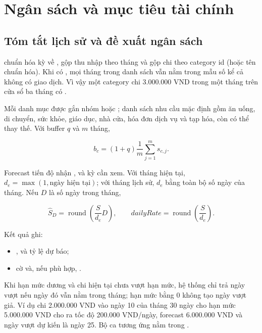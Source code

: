 \section{Ngân sách và mục tiêu tài chính}
\label{app:planning-algorithms}

\subsection{Tóm tắt lịch sử và đề xuất ngân sách}

 chuẩn hóa kỳ về , gộp thu nhập theo tháng và gộp chi theo category id (hoặc tên chuẩn hóa). Khi có , mọi tháng trong danh sách vẫn nằm trong mẫu số kể cả không có giao dịch. Vì vậy một category chi 3.000.000 VND trong một tháng trên cửa sổ ba tháng có .

Mỗi danh mục được gắn nhóm  hoặc ; danh sách nhu cầu mặc định gồm ăn uống, di chuyển, sức khỏe, giáo dục, nhà cửa, hóa đơn dịch vụ và tạp hóa, còn  có thể thay thế. Với buffer $q$ và $m$ tháng,

\begin{equation}
  b_c=(1+q)\frac{1}{m}\sum_{j=1}^{m}s_{c,j}.
\end{equation}

Forecast tiến độ nhận ,  và kỳ cần xem. Với tháng hiện tại, $d_e=\max(1,\text{ngày hiện tại})$; với tháng lịch sử, $d_e$ bằng toàn bộ số ngày của tháng. Nếu $D$ là số ngày trong tháng,

\begin{equation}
  \widehat S_D=\operatorname{round}\!\left(\frac{S}{d_e}D\right),
  \qquad dailyRate=\operatorname{round}\!\left(\frac{S}{d_e}\right).
\end{equation}

Kết quả ghi:
\begin{itemize}
  \item {},  và tỷ lệ dự báo;
  \item cờ  và, nếu phù hợp, .
\end{itemize}
Khi hạn mức dương và chi hiện tại chưa vượt hạn mức, hệ thống chỉ trả ngày vượt nếu ngày đó vẫn nằm trong tháng; hạn mức bằng 0 không tạo ngày vượt giả. Ví dụ chi 2.000.000 VND vào ngày 10 của tháng 30 ngày cho hạn mức 5.000.000 VND cho ra tốc độ 200.000 VND/ngày, forecast 6.000.000 VND và ngày vượt dự kiến là ngày 25. Bộ ca tương ứng nằm trong .

